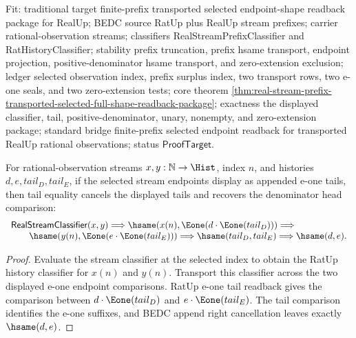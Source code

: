 Fit: traditional target finite-prefix transported selected endpoint-shape
readback package for RealUp; BEDC source RatUp plus RealUp stream prefixes;
carrier rational-observation streams; classifiers RealStreamPrefixClassifier
and RatHistoryClassifier; stability prefix truncation, prefix hsame transport,
endpoint projection, positive-denominator hsame transport, and zero-extension
exclusion; ledger selected observation index, prefix surplus index, two
transport rows, two e-one seals, and two zero-extension tests; core theorem
\autoref{thm:real-stream-prefix-transported-selected-full-shape-readback-package};
exactness the displayed classifier, tail, positive-denominator, unary, nonempty,
and zero-extension package; standard bridge finite-prefix selected endpoint
readback for transported RealUp rational observations; status
$\mathsf{ProofTarget}$.

\begin{theorem}
\label{thm:real-stream-classifier-selected-append-e1-tail-hsame-cancel}
For rational-observation streams $x,y:\mathbb{N}\to\Hist$, index $n$, and
histories $d,e,tail_D,tail_E$, if the selected stream endpoints display as
appended e-one tails, then tail equality cancels the displayed tails and
recovers the denominator head comparison:
$$
\begin{array}{l}
\mathsf{RealStreamClassifier}(x,y)\Longrightarrow
\hsame(x(n),\Eone(d\cdot\Eone(tail_D)))\Longrightarrow\\
\qquad
\hsame(y(n),\Eone(e\cdot\Eone(tail_E)))\Longrightarrow
\hsame(tail_D,tail_E)\Longrightarrow
\hsame(d,e).
\end{array}
$$
\end{theorem}
\begin{proof}
Evaluate the stream classifier at the selected index to obtain the RatUp
history classifier for $x(n)$ and $y(n)$. Transport this classifier across the
two displayed e-one endpoint comparisons. RatUp e-one tail readback gives the
comparison between $d\cdot\Eone(tail_D)$ and $e\cdot\Eone(tail_E)$. The tail
comparison identifies the e-one suffixes, and BEDC append right cancellation
leaves exactly $\hsame(d,e)$.
\end{proof}
